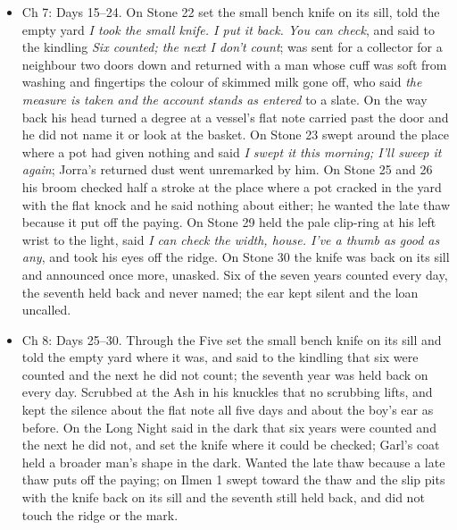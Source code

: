 \documentclass{design/chronicle}
\begin{document}
{\begin{itemize}[leftmargin=1.4em,itemsep=1pt,topsep=3pt,parsep=0pt]

\item Ch 7: Days 15--24. On Stone 22 set the small bench knife on its sill, told the empty yard \emph{I took the small knife. I put it back. You can check}, and said to the kindling \emph{Six counted; the next I don’t count}; was sent for a collector for a neighbour two doors down and returned with a man whose cuff was soft from washing and fingertips the colour of skimmed milk gone off, who said \emph{the measure is taken and the account stands as entered} to a slate. On the way back his head turned a degree at a vessel’s flat note carried past the door and he did not name it or look at the basket. On Stone 23 swept around the place where a pot had given nothing and said \emph{I swept it this morning; I’ll sweep it again}; Jorra’s returned dust went unremarked by him. On Stone 25 and 26 his broom checked half a stroke at the place where a pot cracked in the yard with the flat knock and he said nothing about either; he wanted the late thaw because it put off the paying. On Stone 29 held the pale clip-ring at his left wrist to the light, said \emph{I can check the width, house. I’ve a thumb as good as any}, and took his eyes off the ridge. On Stone 30 the knife was back on its sill and announced once more, unasked. Six of the seven years counted every day, the seventh held back and never named; the ear kept silent and the loan uncalled.

\end{itemize}

\begin{itemize}[leftmargin=1.4em,itemsep=1pt,topsep=3pt,parsep=0pt]

\item Ch 8: Days 25--30. Through the Five set the small bench knife on its sill and told the empty yard where it was, and said to the kindling that six were counted and the next he did not count; the seventh year was held back on every day. Scrubbed at the Ash in his knuckles that no scrubbing lifts, and kept the silence about the flat note all five days and about the boy’s ear as before. On the Long Night said in the dark that six years were counted and the next he did not, and set the knife where it could be checked; Garl’s coat held a broader man’s shape in the dark. Wanted the late thaw because a late thaw puts off the paying; on Ilmen 1 swept toward the thaw and the slip pits with the knife back on its sill and the seventh still held back, and did not touch the ridge or the mark.


\end{itemize}}
\end{document}

